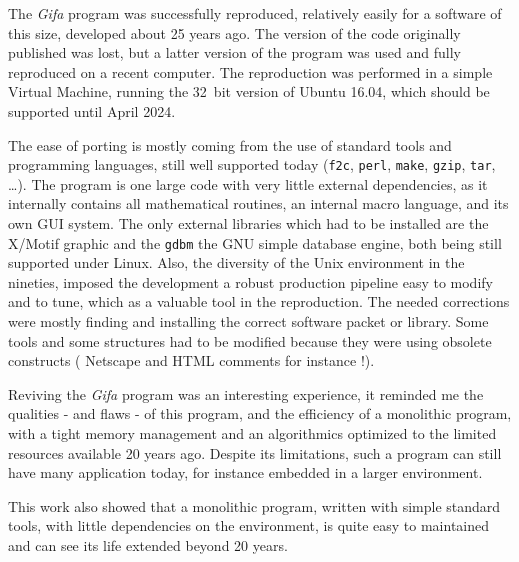 The \emph{Gifa} program was successfully reproduced, relatively easily
for a software of this size, developed about 25 years ago.
The version of the code originally published was lost, but a latter version of
the program was used and fully reproduced on a recent computer.
The reproduction was performed in a simple Virtual Machine, running the
32\ bit version of Ubuntu 16.04, which should be supported until April
2024.

The ease of porting is mostly coming from the use of standard tools and
programming languages, still well supported today (\texttt{f2c},
\texttt{perl}, \texttt{make}, \texttt{gzip}, \texttt{tar}, \ldots{}).
The program is one large code with very little external dependencies, as
it internally contains all mathematical routines, an internal macro
language, and its own GUI system. The only external libraries which had
to be installed are the X/Motif graphic and the \texttt{gdbm} the GNU
simple database engine, both being still supported under Linux. Also,
the diversity of the Unix environment in the nineties, imposed the
development a robust production pipeline easy to modify and to tune,
which as a valuable tool in the reproduction. The needed corrections
were mostly finding and installing the correct software packet or
library. Some tools and some structures had to be modified because they
were using obsolete constructs ( Netscape and HTML comments for instance
!).

Reviving the \emph{Gifa} program was an interesting experience, it
reminded me the qualities - and flaws - of this program, and the
efficiency of a monolithic program, with a tight memory management and
an algorithmics optimized to the limited resources available 20 years
ago. Despite its limitations, such a program can still have many
application today, for instance embedded in a larger environment.

This work also showed that a monolithic program, written with simple
standard tools, with little dependencies on the environment, is quite
easy to maintained and can see its life extended beyond 20 years.

